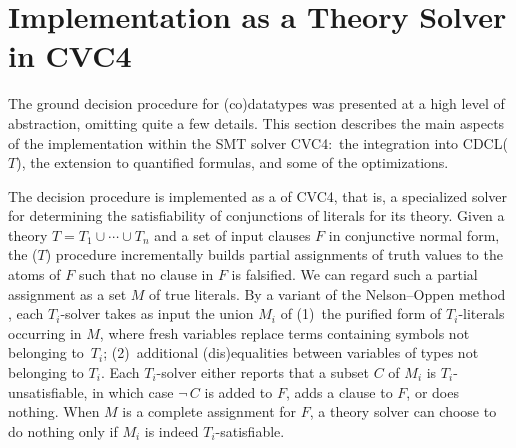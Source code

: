 \section{Implementation as a Theory Solver in CVC4}
\label{sec:implementation-as-a-theory-solver-in-cvc4}

The ground decision procedure for (co)datatypes
was presented at a high level of abstraction, omitting quite a few details. This
section describes the main aspects of the implementation within the SMT solver
CVC4:\ the integration into CDCL($T$), the extension to quantified formulas, and
some of the optimizations.


The decision procedure is implemented as a  of CVC4, that is, a
specialized solver for determining the satisfiability of conjunctions of
literals for its theory.
Given a theory $T = T_1 \mathrel\cup \cdots \mathrel\cup T_n$ and a set of
input clauses $F$ in conjunctive normal form, the \XXXL($T$) procedure
incrementally builds partial assignments of
truth values to the atoms of $F$ such that no clause in $F$ is falsified. We can regard such a
partial assignment as a set $M$ of true literals.
By a variant of the Nelson--Oppen method \cite{jovanovic2011sharing,nelson-oppen-1979},
each $T_i$-solver %
takes as input the union $M_i$
of (1)~the purified form of $T_i$-literals occurring in $M$, where fresh
variables replace terms containing symbols not belonging to~$T_i$;
(2)~additional (dis)equalities between variables of types not belonging to
$T_i$. Each $T_i$-solver
either reports that a subset $C$ of $M_i$ is $T_i$-unsatisfiable, in which case
$\neg\, C$ is added to $F\!$, adds a clause to $F\!$, or does nothing.
When $M$ is a complete assignment for $F\!$, a theory solver can choose to do
nothing only if $M_i$ is indeed $T_i$-satisfiable.

